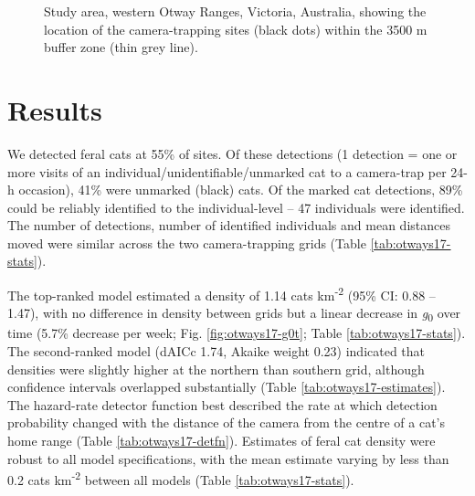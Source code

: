 \documentclass[11pt,a4paper,titlepage,twoside,openright]{style/unimelbthesis}
\begin{document}
\begin{mainmatter}
\begin{figure}
\caption{Study area, western Otway Ranges, Victoria, Australia, showing the location of the camera-trapping sites (black dots) within the 3500 m buffer zone (thin grey line).}\label{fig:otways17-map}
\end{figure}
\newpage

\hypertarget{results-2}{%
\section{Results}\label{results-2}}

We detected feral cats at 55\% of sites. Of these detections (1 detection = one or more visits of an individual/unidentifiable/unmarked cat to a camera-trap per 24-h occasion), 41\% were unmarked (black) cats. Of the marked cat detections, 89\% could be reliably identified to the individual-level -- 47 individuals were identified. The number of detections, number of identified individuals and mean distances moved were similar across the two camera-trapping grids (Table \ref{tab:otways17-stats}).

The top-ranked model estimated a density of 1.14 cats km\textsuperscript{-2} (95\% CI: 0.88 -- 1.47), with no difference in density between grids but a linear decrease in \emph{g}\textsubscript{0} over time (5.7\% decrease per week; Fig. \ref{fig:otways17-g0t}; Table \ref{tab:otways17-stats}). The second-ranked model (dAICc 1.74, Akaike weight 0.23) indicated that densities were slightly higher at the northern than southern grid, although confidence intervals overlapped substantially (Table \ref{tab:otways17-estimates}). The hazard-rate detector function best described the rate at which detection probability changed with the distance of the camera from the centre of a cat's home range (Table \ref{tab:otways17-detfn}). Estimates of feral cat density were robust to all model specifications, with the mean estimate varying by less than 0.2 cats km\textsuperscript{-2} between all models (Table \ref{tab:otways17-stats}).

\newpage

\(~\)

\(~\)


\end{mainmatter}
\end{document}
